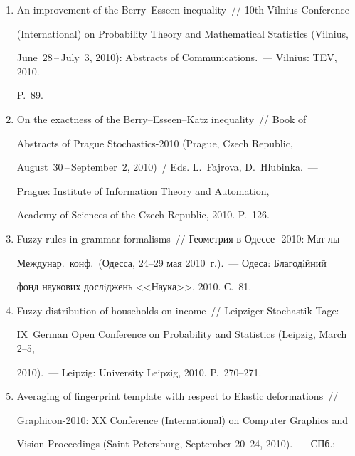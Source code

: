 \begin{enumerate}[1.]
Azerbaijan, September 6--8, 2010). Vol.~1.~--- Baku: Elm, 2010. P.~290--293.


\item {}


An improvement of the Berry--Esseen inequality~/\!\!/  10th  Vilnius Conference 


(International) on Probability Theory and Mathematical Statistics (Vilnius, 


June~28\,--\,July~3, 2010): Abstracts of Communications.~--- Vilnius: TEV, 2010. 


P.~89.


\item {}


On the exactness of the Berry--Esseen--Katz inequality~/\!\!/  Book of 


Abstracts of Prague Stochastics-2010 (Prague, Czech Republic, 


August~30\,--\,September~2, 2010)~/  Eds. L.~Fajrova, D.~Hlubinka.~--- 


Prague: Institute of Information Theory and Automation, 


Academy of Sciences of the Czech Republic, 2010. P.~126.


\item{}


Fuzzy rules in grammar formalisms~/\!\!/  Геометрия в Одессе- 2010: Мат-лы 


Междунар.\ конф.\ (Одесса, 24--29 мая 2010~г.).~--- Одеса: Благодiйний 


фонд наукових дослiджень <<Наука>>, 2010. С.~81.


\item {}


Fuzzy distribution of households on income~/\!\!/  Leipziger Stochastik-Tage: 


IX~German Open Conference on Probability and Statistics (Leipzig, March 2--5,


2010).~--- Leipzig: University Leipzig, 2010. P.~270--271.


\item{}


Averaging of fingerprint template with respect to Elastic deformations~/\!\!/  


Graphicon-2010:  XX Conference (International) on Computer Graphics and 


Vision Proceedings (Saint-Petersburg, September 20--24, 2010).~--- СПб.: 



\end{enumerate}
